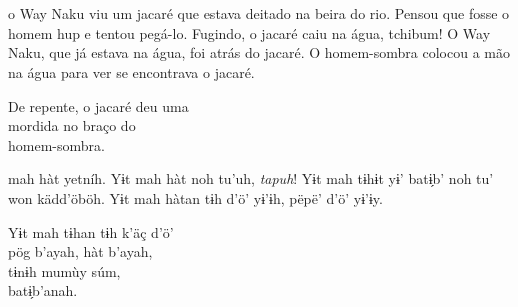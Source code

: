 \chapter*{}


 o Way Naku viu um
jacaré que estava deitado
na beira do rio. Pensou
que fosse o homem hup e
tentou pegá-lo. Fugindo,
o jacaré caiu na água,
tchibum! O Way Naku,
que já estava na água,
foi atrás do jacaré. O
homem-sombra colocou a
mão na água para ver se
encontrava o jacaré.

\medskip

De repente, o jacaré deu uma\\
mordida no braço do\\
homem-sombra.

\vspace{2em}

 mah hàt yetníh. Yɨt
mah hàt noh tu’uh, \textit{tapuh}!
Yɨt mah tɨhɨt yɨ’ batɨ̗b’ noh
tu’ won kädd’öböh. Yɨt
mah hàtan tɨh d’ö’ yɨ’ɨh,
pëpë’ d’ö’ yɨ’ɨy.

\medskip

Yɨt mah tɨhan tɨh k’äç d’ö’\\
pög b’ayah, hàt b’ayah,\\
tɨnɨh mumùy súm,\\
batɨ̗b’anah.

\vspace*{\fill}

